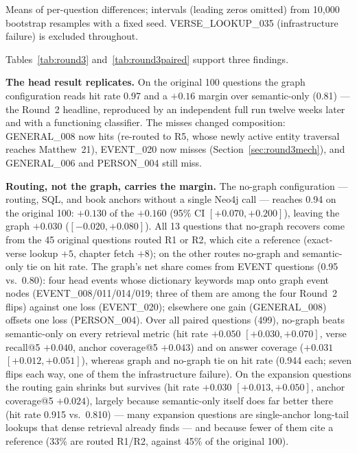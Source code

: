 \begin{table}[!t]
\begin{threeparttable}
\begin{tabular}{@{}llcccccc@{}}
\bottomrule
\end{tabular}
\begin{tablenotes}\footnotesize
\item Means of per-question differences; intervals (leading zeros
omitted) from 10{,}000 bootstrap resamples with a fixed seed.
VERSE\_LOOKUP\_035 (infrastructure failure) is excluded throughout.
\end{tablenotes}
\end{threeparttable}
\end{table}

Tables~\ref{tab:round3} and~\ref{tab:round3paired} support three
findings.

\textbf{The head result replicates.} On the original 100 questions the
graph configuration reads hit rate 0.97 and a $+0.16$ margin over
semantic-only (0.81) --- the Round~2 headline, reproduced by an
independent full run twelve weeks later and with a functioning
classifier. The misses changed composition: GENERAL\_008 now hits
(re-routed to R5, whose newly active entity traversal reaches
Matthew~21), EVENT\_020 now misses (Section~\ref{sec:round3mech}), and
GENERAL\_006 and PERSON\_004 still miss.

\textbf{Routing, not the graph, carries the margin.} The no-graph
configuration --- routing, SQL, and book anchors without a single Neo4j
call --- reaches 0.94 on the original 100: $+0.130$ of the $+0.160$
(95\% CI $[+0.070, +0.200]$), leaving the graph $+0.030$
($[-0.020, +0.080]$). All 13 questions that no-graph recovers come from
the 45 original questions routed R1 or R2, which cite a reference
(exact-verse lookup $+5$, chapter fetch $+8$); on the other routes
no-graph and semantic-only tie on hit rate. The graph's net share comes from EVENT questions
(0.95 vs.\ 0.80): four head events whose dictionary keywords map onto
graph event nodes (EVENT\_008/011/014/019; three of them are among the
four Round~2 flips) against one loss (EVENT\_020); elsewhere one gain
(GENERAL\_008) offsets one loss (PERSON\_004). Over all paired questions
(499), no-graph beats semantic-only on every retrieval metric (hit rate
$+0.050$ $[+0.030, +0.070]$, verse recall@5 $+0.040$, anchor
coverage@5 $+0.043$) and on answer coverage ($+0.031$ $[+0.012, +0.051]$), whereas
graph and no-graph tie on hit rate (0.944 each; seven flips each way,
one of them the infrastructure failure).
On the expansion questions the routing gain shrinks but survives (hit
rate $+0.030$ $[+0.013, +0.050]$, anchor coverage@5 $+0.024$), largely
because semantic-only itself does far better there (hit rate 0.915
vs.\ 0.810) --- many expansion questions are single-anchor long-tail
lookups that dense retrieval already finds --- and because fewer of them
cite a reference (33\% are routed R1/R2, against 45\% of the original
100).

